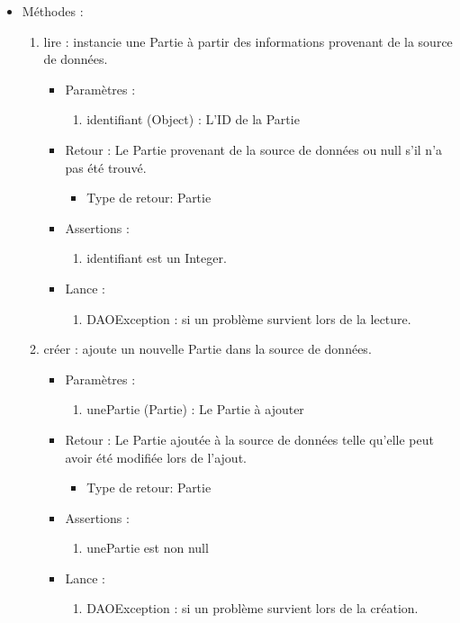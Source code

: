 \begin{itemize}
\item Méthodes : 

  \begin{enumerate}
  \item lire : instancie une Partie à partir des informations provenant de la source de données.
    \begin{itemize}
    \item Paramètres : 
      \begin{enumerate}
      \item identifiant (Object) : L'ID de la Partie
      \end{enumerate}
    \item Retour : Le Partie provenant de la source de données ou null s'il n'a pas été trouvé.
      \begin{itemize}
      \item Type de retour: Partie
      \end{itemize}
    \item Assertions : 
      \begin{enumerate}
      \item identifiant est un Integer.
      \end{enumerate}
    \item Lance :
      \begin{enumerate}
      \item DAOException : si un problème survient lors de la lecture.
      \end{enumerate}
    \end{itemize}

  \item créer : ajoute un nouvelle Partie dans la source de données.
    \begin{itemize}
    \item Paramètres : 
      \begin{enumerate}
      \item unePartie (Partie) : Le Partie à ajouter
      \end{enumerate}
    \item Retour : Le Partie ajoutée à la source de données telle qu'elle peut avoir été modifiée lors de l'ajout.
      \begin{itemize}
      \item Type de retour: Partie
      \end{itemize}
    \item Assertions : 
      \begin{enumerate}
      \item unePartie est non null
      \end{enumerate}
    \item Lance :
      \begin{enumerate}
      \item DAOException : si un problème survient lors de la création.
      \end{enumerate}
    \end{itemize}


\end{enumerate}
\end{itemize}
